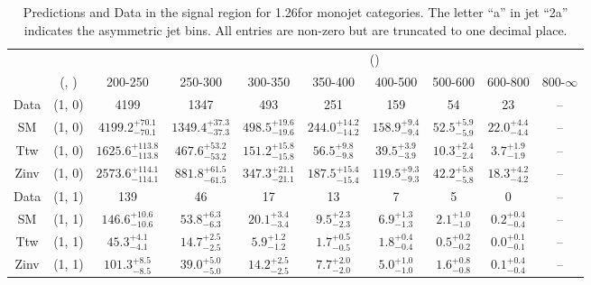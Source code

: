 \begin{table}[h!]
\tiny
\centering
\caption{Predictions and Data in the signal region for 1.26\ifb for monojet categories. The letter ``a'' in jet \eg ``2a''  indicates the asymmetric jet bins. All entries are non-zero but are truncated to one decimal place.\label{tab:yieldsallpost_sig_comb_mono}}
\begin{tabular}
{cccccccccc}
	\hline\hline
&	&	& \multicolumn{8}{c}{\scalht (\gev)}\\ 
	&	 (\njet, \nb) & 200-250 & 250-300 & 300-350 & 350-400 & 400-500 & 500-600 & 600-800 & 800-$\infty$ \\ [0.8ex] 
\hline
	Data & (1, 0) & 4199 & 1347 & 493 & 251 & 159 & 54 & 23 & -- \\[0.5ex] 
	SM & (1, 0) & $4199.2^{+ 70.1 }_{- 70.1 }$ & $1349.4^{+ 37.3 }_{- 37.3 }$ & $498.5^{+ 19.6 }_{- 19.6 }$ & $244.0^{+ 14.2 }_{- 14.2 }$ & $158.9^{+ 9.4 }_{- 9.4 }$ & $52.5^{+ 5.9 }_{- 5.9 }$ & $22.0^{+ 4.4 }_{- 4.4 }$ & -- \\[0.5ex] 
	Ttw & (1, 0) & $1625.6^{+ 113.8 }_{- 113.8 }$ & $467.6^{+ 53.2 }_{- 53.2 }$ & $151.2^{+ 15.8 }_{- 15.8 }$ & $56.5^{+ 9.8 }_{- 9.8 }$ & $39.5^{+ 3.9 }_{- 3.9 }$ & $10.3^{+ 2.4 }_{- 2.4 }$ & $3.7^{+ 1.9 }_{- 1.9 }$ & -- \\[0.5ex] 
	Zinv & (1, 0) & $2573.6^{+ 114.1 }_{- 114.1 }$ & $881.8^{+ 61.5 }_{- 61.5 }$ & $347.3^{+ 21.1 }_{- 21.1 }$ & $187.5^{+ 15.4 }_{- 15.4 }$ & $119.5^{+ 9.3 }_{- 9.3 }$ & $42.2^{+ 5.8 }_{- 5.8 }$ & $18.3^{+ 4.2 }_{- 4.2 }$ & -- \\[0.5ex] 
	Data & (1, 1) & 139 & 46 & 17 & 13 & 7 & 5 & 0 & -- \\[0.5ex] 
	SM & (1, 1) & $146.6^{+ 10.6 }_{- 10.6 }$ & $53.8^{+ 6.3 }_{- 6.3 }$ & $20.1^{+ 3.4 }_{- 3.4 }$ & $9.5^{+ 2.3 }_{- 2.3 }$ & $6.9^{+ 1.3 }_{- 1.3 }$ & $2.1^{+ 1.0 }_{- 1.0 }$ & $0.2^{+ 0.4 }_{- 0.4 }$ & -- \\[0.5ex] 
	Ttw & (1, 1) & $45.3^{+ 4.1 }_{- 4.1 }$ & $14.7^{+ 2.5 }_{- 2.5 }$ & $5.9^{+ 1.2 }_{- 1.2 }$ & $1.7^{+ 0.5 }_{- 0.5 }$ & $1.8^{+ 0.4 }_{- 0.4 }$ & $0.5^{+ 0.2 }_{- 0.2 }$ & $0.0^{+ 0.1 }_{- 0.1 }$ & -- \\[0.5ex] 
	Zinv & (1, 1) & $101.3^{+ 8.5 }_{- 8.5 }$ & $39.0^{+ 5.0 }_{- 5.0 }$ & $14.2^{+ 2.5 }_{- 2.5 }$ & $7.7^{+ 2.0 }_{- 2.0 }$ & $5.0^{+ 1.0 }_{- 1.0 }$ & $1.6^{+ 0.8 }_{- 0.8 }$ & $0.1^{+ 0.4 }_{- 0.4 }$ & -- \\[0.5ex] 
	\hline
	\hline
\end{tabular}
\end{table}
